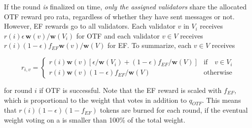 If the round \emph{is} finalized on time, \emph{only the assigned validators} share the allocated OTF reward pro rata, regardless of whether they have sent messages or not. However, EF rewards go to all validators. Each validator $v$ in $V_i$ receives $r(i)\epsilon \,\boldsymbol{w}(v)/\boldsymbol{w}(V_i)$ for OTF and each validator $v\in V$ receives $r(i)(1-\epsilon)f_{EF}\boldsymbol{w}(v)/\boldsymbol{w}(V)$ for EF. To summarize, each $v\in V$ receives

\begin{equation}
  r_{i,v} = \begin{cases} r(i)\boldsymbol{w}(v)[\epsilon/\boldsymbol{w}(V_i) + (1-\epsilon)f_{EF}/\boldsymbol{w}(V)] &\text{if}\quad v\in V_i\\
    r(i)\boldsymbol{w}(v)(1-\epsilon)f_{EF}/\boldsymbol{w}(V) & \text{otherwise}
  \end{cases}
\end{equation}

for round $i$ if OTF is successful. Note that the EF reward is scaled with $f_{EF}$, which is proportional to the weight that votes in addition to $q_{OTF}$. This means that $r(i)(1-\epsilon)(1-f_{EF})$ tokens are burned for each round, if the eventual weight voting on a \PROP is smaller than 100\% of the total weight.




